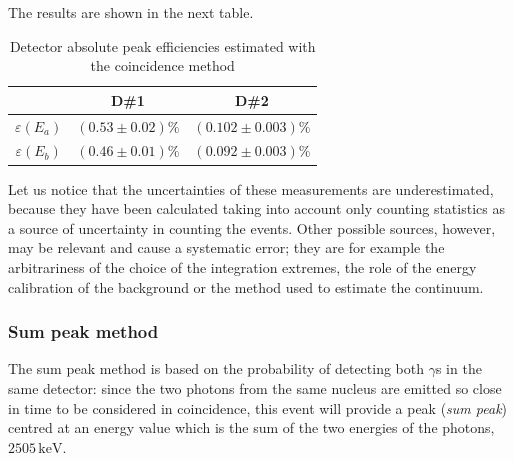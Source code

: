 \documentclass[a4paper]{article}
\begin{document}
The results are shown in the next table.
\begin{table}[H]
    \centering
    \begin{tabular}{|c|cc|}
         \hline
         & D\#1&D\#2\\
         \hline
          $\varepsilon(E_a)$&$(0.53\pm0.02)\%$ & $(0.102\pm0.003)\%$ \\
          $\varepsilon(E_b)$&$(0.46\pm0.01)\%$ & $(0.092\pm0.003)\%$ \\
          \hline
    \end{tabular}
    \caption{Detector absolute peak efficiencies estimated with the coincidence method}
    \label{tab:coinc_results}
\end{table}
Let us notice that the uncertainties of these measurements are underestimated, because they have been calculated taking into account only counting statistics as a source of uncertainty in counting the events. Other possible sources, however, may be relevant and cause a systematic error; they are for example the arbitrariness of the choice of the integration extremes, the role of the energy calibration of the background or the method used to estimate the continuum.

\subsubsection{Sum peak method}\label{sect: sum peak}
The sum peak method is based on the probability of detecting both $\gamma$s in the same detector: %
since the two photons from the same nucleus are emitted so close in time to be considered in coincidence, this event will provide a peak (\textit{sum peak}) centred at an energy value which is the sum of the two energies of the photons, $2505\,\mathrm{keV}$.
\end{document}
